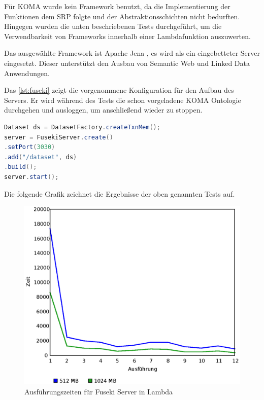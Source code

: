 \documentclass[
12pt,
english,
ngerman,
headsepline,
twoside,
openright,
numbers=noenddot,version=first
]{scrreprt}
\begin{document}
Für \acrshort{KOMA} wurde kein Framework benutzt, da die Implementierung der Funktionen dem \acrshort{SRP} folgte und der Abstraktionsschichten nicht bedurften. Hingegen wurden die unten beschriebenen Tests durchgeführt, um die Verwendbarkeit von Frameworks innerhalb einer Lambdafunktion auszuwerten. 

Das ausgewählte Framework ist Apache Jena \cite{fuseki}, es wird als ein eingebetteter Server eingesetzt. Dieser unterstützt den Ausbau von Semantic Web und Linked Data Anwendungen.

Das \autoref{lst:fuseki} zeigt die vorgenommene Konfiguration für den Aufbau des Servers. Er wird während des Tests die schon vorgeladene \acrshort{KOMA} Ontologie durchgehen und ausloggen, um anschließend wieder zu stoppen.

\begin{lstlisting}[language=Java,caption={Embedded Server in Lambda},label={lst:fuseki}]
Dataset ds = DatasetFactory.createTxnMem();
server = FusekiServer.create()
.setPort(3030)
.add("/dataset", ds)
.build();
server.start();

\end{lstlisting}

Die folgende Grafik zeichnet die Ergebnisse der oben genannten Tests auf. 

\begin{figure}[H]
	\centering{}
	\includegraphics[scale=0.60]{./pics/cold-fuseky.eps}
	\caption{Ausführungszeiten für Fuseki Server in Lambda }
\end{figure}
\end{document}
